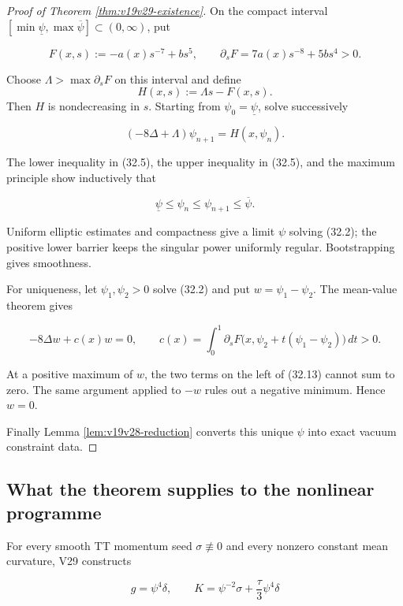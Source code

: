 \documentclass[11pt]{article}
\theoremstyle{remark}
\begin{document}
\begin{proof}[Proof of Theorem \ref{thm:v19v29-existence}]
On the compact interval
\([\min\underline\psi,\max\overline\psi]\subset(0,\infty)\), put

\[
 F(x,s):=-a(x)s^{-7}+bs^5,\qquad
 \partial_sF=7a(x)s^{-8}+5bs^4>0.                             \tag{32.9}
\]

Choose \(\Lambda>\max\partial_sF\) on this interval and define
\[
 H(x,s):=\Lambda s-F(x,s).                                   \tag{32.10}
\]
Then \(H\) is nondecreasing in \(s\).  Starting from
\(\psi_0=\underline\psi\), solve successively

\[
 (-8\Delta+\Lambda)\psi_{n+1}=H(x,\psi_n).                    \tag{32.11}
\]

The lower inequality in (32.5), the upper inequality in (32.5), and the
maximum principle show inductively that

\[
 \underline\psi\leq\psi_n\leq\psi_{n+1}\leq\overline\psi.
                                                                    \tag{32.12}
\]

Uniform elliptic estimates and compactness give a limit \(\psi\) solving
(32.2); the positive lower barrier keeps the singular power uniformly
regular.  Bootstrapping gives smoothness.

For uniqueness, let \(\psi_1,\psi_2>0\) solve (32.2) and put
\(w=\psi_1-\psi_2\).  The mean-value theorem gives

\[
 -8\Delta w+c(x)w=0,\qquad
 c(x)=\int_0^1
 \partial_sF\bigl(x,\psi_2+t(\psi_1-\psi_2)\bigr)\,dt>0.
                                                                    \tag{32.13}
\]

At a positive maximum of \(w\), the two terms on the left of (32.13)
cannot sum to zero.  The same argument applied to \(-w\) rules out a
negative minimum.  Hence \(w=0\).

Finally Lemma \ref{lem:v19v28-reduction} converts this unique \(\psi\)
into exact vacuum constraint data.
\end{proof}

\subsection{What the theorem supplies to the nonlinear programme}

For every smooth TT momentum seed \(\sigma\not\equiv0\) and every
nonzero constant mean curvature, V29 constructs

\[
 g=\psi^4\delta,\qquad
 K=\psi^{-2}\sigma+\frac{\tau}{3}\psi^4\delta                 \tag{32.14}
\]
\end{document}

